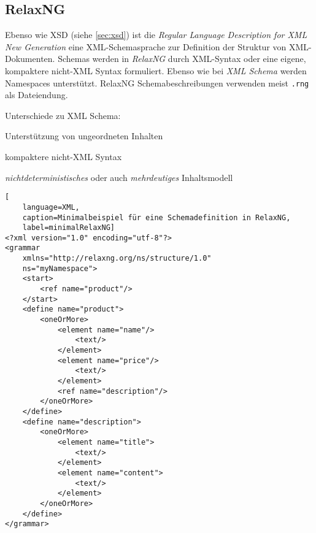 \subsection{RelaxNG}
\label{sec:relaxng}

Ebenso wie XSD (siehe \cref{sec:xsd}) ist die \emph{Regular Language Description for XML New Generation} eine XML-Schemasprache zur Definition der Struktur von XML-Dokumenten. 
Schemas werden in \emph{RelaxNG} durch XML-Syntax oder eine eigene, kompaktere nicht-XML Syntax formuliert. Ebenso wie bei \emph{XML Schema} werden Namespaces unterstützt. RelaxNG Schemabeschreibungen verwenden meist \texttt{.rng} als Dateiendung.

Unterschiede zu XML Schema:
\begin{compactitem}
    \item Unterstützung von ungeordneten Inhalten
    \item kompaktere nicht-XML Syntax
    \item \emph{nichtdeterministisches} oder auch \emph{mehrdeutiges} Inhaltsmodell \cite[Kapitel 16]{RelaxNGVlist}    
\end{compactitem}

\begin{lstlisting}[
    language=XML, 
    caption=Minimalbeispiel für eine Schemadefinition in RelaxNG, 
    label=minimalRelaxNG]
<?xml version="1.0" encoding="utf-8"?>
<grammar 
    xmlns="http://relaxng.org/ns/structure/1.0"
    ns="myNamespace">
    <start>
        <ref name="product"/>
    </start>
    <define name="product">
        <oneOrMore>
            <element name="name"/>
                <text/>
            </element>
            <element name="price"/>
                <text/>
            </element>
            <ref name="description"/>
        </oneOrMore>
    </define>
    <define name="description">
        <oneOrMore>
            <element name="title">
                <text/>
            </element>
            <element name="content">
                <text/>
            </element>
        </oneOrMore>
    </define>
</grammar>
\end{lstlisting}
